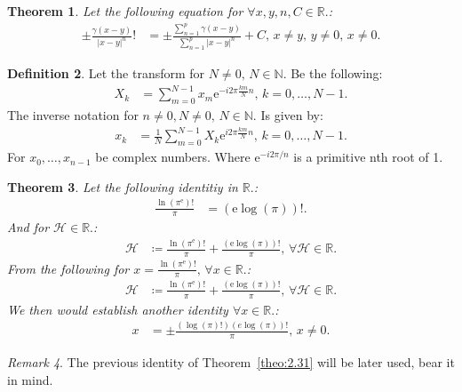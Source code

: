 \documentclass[10pt]{article}
\theoremstyle{plain}
\newtheorem{theorem}{Theorem}[section]
\theoremstyle{definition}
\newtheorem{definition}[theorem]{Definition}
\theoremstyle{remark}
\newtheorem{remark}[theorem]{Remark}
\begin{document}
\begin{theorem}
	Let the following equation for $\forall x, y, n, C \in \mathbb{R}.$:
	\begin{align*}
		\pm \frac{\gamma(x-y)}{|x - y|^{n}}! &= \pm \frac{\sum_{n=1}^{p}\gamma(x-y)}{\sum_{n=1}^{p}|x - y|^{n}} + C, \, x \neq y, \, y \neq 0, \, x \neq 0.
	\end{align*}
\end{theorem}

\begin{definition}
	Let the transform for $N \neq 0, \, N \in \mathbb{N}.$ Be the following:
	\begin{align*}
		X_k &= \sum_{m=0}^{N-1} x_{m}\mathrm{e}^{-i2\pi \frac{km}{N}n}, \, k = 0,\dots,N-1.
	\end{align*}
	The inverse notation for $n \neq 0, N \neq 0, \, N \in \mathbb{N}.$ Is given by:
	\begin{align*}
		x_k &= \frac{1}{N} \sum_{m=0}^{N-1} X_k \mathrm{e}^{i2\pi \frac{km}{N}n}, \, k = 0,\dots,N-1.
	\end{align*}
	For $x_{0}, \dots, x_{n-1}$ be complex numbers. Where $\mathrm{e}^{-i2\pi /n}$ is a primitive nth root of 1.
\end{definition}

\begin{theorem}
	Let the following identitiy in $\mathbb{R}.$:
	\begin{align*}
		\frac{\ln(\pi^\mathrm{e})!}{\pi} &= (\mathrm{e} \log(\pi))!.
	\end{align*}
	And for $\mathcal{H} \in \mathbb{R}.$:
	\begin{align*}
		\mathcal{H} &\coloneq \frac{\ln(\pi^\mathrm{e})!}{\pi} + \frac{(\mathrm{e} \log(\pi))!}{\pi}, \, \forall \mathcal{H} \in \mathbb{R}.
	\end{align*}
	From the following for $x = \frac{\ln(\pi^\mathrm{e})!}{\pi}, \, \forall x \in \mathbb{R}.$:
	\begin{align*}
	\mathcal{H} &\coloneq \frac{\ln(\pi^\mathrm{e})!}{\pi} + \frac{(\mathrm{e} \log(\pi))!}{\pi}, \, \forall \mathcal{H} \in \mathbb{R}.
	\end{align*}
	We then would establish another identity $\forall x \in \mathbb{R}.$:
	\begin{align*}
		x &= \pm \frac{(\log(\pi)!) (e \log(\pi))!}{\pi}, \, x \neq 0.
	\end{align*}
\end{theorem}
\begin{remark}
	The previous identity of Theorem~\ref{theo:2.31} will be later used, bear it in mind.
\end{remark}
\end{document}
